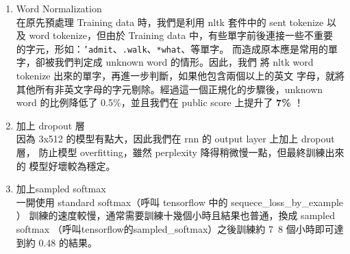 \documentclass[12pt, a4paper]{article}
\theoremstyle{mystyle}	%
\begin{document}
\begin{enumerate}
  \item Word Normalization\\
    在原先預處理 Training data 時，我們是利用 nltk 套件中的 sent tokenize
    以及 word tokenize，但由於 Training data 中，有些單字前後連接一些不重要
    的字元，形如：\texttt{'admit}、\texttt{.walk}、\texttt{*what}、等單字。
    而造成原本應是常用的單字，卻被我們判定成 unknown word 的情形。因此，我們
    將 nltk word tokenize 出來的單字，再進一步判斷，如果他包含兩個以上的英文
    字母，就將其他所有非英文字母的字元剔除。經過這一個正規化的步驟後，unknown
    word 的比例降低了 0.5\%，並且我們在 public score 上提升了 \textbf{7\%} ！
  \item 加上 dropout 層 \\
    因為 3x512 的模型有點大，因此我們在 rnn 的 output layer 上加上 dropout 層，
    防止模型 overfitting，雖然 perplexity 降得稍微慢一點，但最終訓練出來的
    模型好壞較為穩定。
  \item 加上sampled softmax\\
    一開使用 standard softmax（呼叫 tensorflow 中的 sequece\_loss\_by\_example ）
    訓練的速度較慢，通常需要訓練十幾個小時且結果也普通，換成 sampled softmax
    （呼叫tensorflow的sampled\_softmax）之後訓練約 7~8 個小時即可達到約 0.48 的結果。
\end{enumerate}
\end{document}

